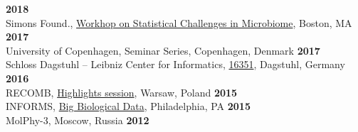 \documentclass[margin,line,letterpaper]{resume}
\begin{document}
\begin{resume}
        \hfill \textbf{2018}\\
        Simons Found., \href{https://indico.flatironinstitute.org/category/17/attachments/30/35/General_Agenda_SACMDA2_.pdf}{Workhop on Statistical Challenges in Microbiome}, Boston, MA %
         \hfill \textbf{2017}\\
         University of Copenhagen, Seminar Series, Copenhagen, Denmark  \hfill \textbf{2017}\\
         Schloss Dagstuhl -- Leibniz Center for Informatics, \href{https://www.dagstuhl.de/no_cache/en/program/calendar/partlist/?semnr=16351&SUOG=}{16351}, Dagstuhl, Germany  \hfill \textbf{2016}\\
         RECOMB, \href{http://recomb2015.mimuw.edu.pl/node/6.html}{Highlights session}, Warsaw, Poland %
         \hfill \textbf{2015}\\
         INFORMS, \href{http://meetings2.informs.org/wordpress/philadelphia/files/2015/10/Monday.pdf}{Big Biological Data}, Philadelphia, PA %
         \hfill \textbf{2015}\\
         MolPhy-3, Moscow, Russia %
         \hfill \textbf{2012}\vspace{1mm}

\end{resume}
\end{document}
